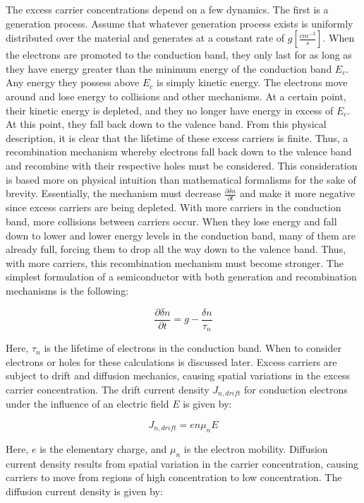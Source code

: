 The excess carrier concentrations depend on a few dynamics. The first is a generation process. Assume that whatever generation process exists is uniformly distributed over the material and generates at a constant rate of $g [\frac{cm^{-3}}{s}]$. When the electrons are promoted to the conduction band, they only last for as long as they have energy greater than the minimum energy of the conduction band $E_c$. Any energy they possess above $E_c$ is simply kinetic energy. The electrons move around and lose energy to collisions and other mechanisms. At a certain point, their kinetic energy is depleted, and they no longer have energy in excess of $E_c$. At this point, they fall back down to the valence band.
From this physical description, it is clear that the lifetime of these excess carriers is finite. Thus, a recombination mechanism whereby electrons fall back down to the valence band and recombine with their respective holes must be considered. This consideration is based more on physical intuition than mathematical formalisms for the sake of brevity. Essentially, the mechanism must decrease $\frac{\partial \delta n}{\partial t}$ and make it more negative since excess carriers are being depleted. With more carriers in the conduction band, more collisions between carriers occur. When they lose energy and fall down to lower and lower energy levels in the conduction band, many of them are already full, forcing them to drop all the way down to the valence band. Thus, with more carriers, this recombination mechanism must become stronger. The simplest formulation of a semiconductor with both generation and recombination mechanisms is the following:

\begin{equation}
	\label{eq:gen_and_rec}
	\frac{\partial \delta n}{\partial t} = g - \frac{\delta n}{\tau _n}
\end{equation}

Here, $\tau _n$ is the lifetime of electrons in the conduction band. When to consider electrons or holes for these calculations is discussed later.
Excess carriers are subject to drift and diffusion mechanics, causing spatial variations in the excess carrier concentration. The drift current density $J_{n,drift}$ for conduction electrons under the influence of an electric field $E$ is given by:

\begin{equation}
	\label{eq:drift}
	J_{n,drift} = en\mu _nE
\end{equation}

Here, $e$ is the elementary charge, and $\mu _n$ is the electron mobility. Diffusion current density results from spatial variation in the carrier concentration, causing carriers to move from regions of high concentration to low concentration. The diffusion current density is given by:

